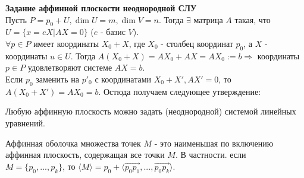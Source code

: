\textbf{Задание аффинной плоскости неоднородной СЛУ}\\
Пусть $P = p_0 + U, \dim U = m, \dim V = n$. Тогда $\exists$ матрица $A$ такая, что $U = \{x = eX | AX = 0\}$ ($e$ - базис $V$).\\
$\forall p \in P$ имеет координаты $X_0 + X$, где $X_0$ - столбец координат $p_0$, а $X$ - координаты $u \in U$.
Тогда $A(X_0 + X) = AX_0 + AX = AX_0 := b \Longrightarrow$ координаты $p \in P$ удовлетворяют системе $AX = b$.\\
Если $p_0$ заменить на $p'_0$ с координатами $X_0 + X', AX' = 0$, то $A(X_0 + X') = AX_0 = b$. Остюда получаем следующее утверждение:
\begin{subtheorem}
    Любую аффинную плоскость можно задать (неоднородной) системой линейных уравнений.
\end{subtheorem}
\begin{definition}
    Аффинная оболочка множества точек $M$ - это наименьшая по включению аффинная плоскость, содержащая все точки $M$. В частности. если $M = \{p_0,...,p_k\}$, то $\langle M \rangle = p_0 + \langle \overrightarrow{p_0p_1},...,\overrightarrow{p_0p_k} \rangle$.
\end{definition}



